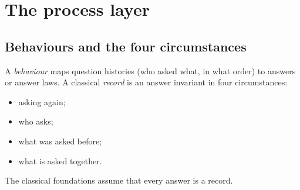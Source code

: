 \documentclass[11pt]{article}
\theoremstyle{definition}
\theoremstyle{remark}
\begin{document}
\section{The process layer}\label{sec:process}

\subsection{Behaviours and the four circumstances}

A \emph{behaviour} maps question histories (who asked what, in what order) to answers or answer laws. A classical \emph{record} is an answer invariant in four circumstances:
\begin{itemize}
\item asking again;
\item who asks;
\item what was asked before;
\item what is asked together.
\end{itemize}
The classical foundations assume that every answer is a record.
\end{document}
